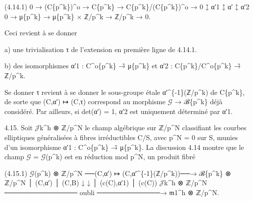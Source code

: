 \documentclass[11pt,a4paper]{article}
\begin{document}
(4.14.1)        0 → (C\textunderscore{}\{p\textasciicircum{}k\})\textasciicircum{}o → C\textunderscore{}\{p\textasciicircum{}k\} → C\textunderscore{}\{p\textasciicircum{}k\}/(C\textunderscore{}\{p\textasciicircum{}k\})\textasciicircum{}o → 0 ↓̃ α′\textunderscore{}1       ↓̃ α′            ↓̃ α′\textunderscore{}2 0 → μ\textunderscore{}\{p\textasciicircum{}k\} → μ\textunderscore{}\{p\textasciicircum{}k\} × ℤ/p\textasciicircum{}k → ℤ/p\textasciicircum{}k → 0.

Ceci revient à se donner

a) une trivialisation τ de l'extension en première ligne de 4.14.1.

b) des isomorphismes α′\textunderscore{}1 : C\textasciicircum{}o\textunderscore{}\{p\textasciicircum{}k\} →̃ μ\textunderscore{}\{p\textasciicircum{}k\} et α′\textunderscore{}2 : C\textunderscore{}\{p\textasciicircum{}k\}/C\textasciicircum{}o\textunderscore{}\{p\textasciicircum{}k\} →̃ ℤ/p\textasciicircum{}k.

Se donner τ revient à se donner le sous-groupe étale α′\textasciicircum{}\{-1\}(ℤ/p\textasciicircum{}k) de C\textunderscore{}\{p\textasciicircum{}k\}, de sorte que (C,α′) ↦ (C,τ) correspond au morphisme \ensuremath{\mathcal{G}} → ℬ\textunderscore{}\{p\textasciicircum{}k\} déjà considéré. Par ailleurs, si det(α′) = 1, α′\textunderscore{}2 est uniquement déterminé par α′\textunderscore{}1.

4.15. Soit \ensuremath{\mathcal{J}}\textunderscore{}k\textasciicircum{}h ⊗ ℤ/p\textasciicircum{}N le champ algébrique sur ℤ/p\textasciicircum{}N classifiant les courbes elliptiques généralisées à fibres irréductibles C/S, avec p\textasciicircum{}N = 0 sur S, munies d'un isomorphisme α′\textunderscore{}1 : C\textasciicircum{}o\textunderscore{}\{p\textasciicircum{}k\} →̃ μ\textunderscore{}\{p\textasciicircum{}k\}. La discussion 4.14 montre que le champ \ensuremath{\mathcal{G}} = \ensuremath{\mathcal{G}}(p\textasciicircum{}k) est en réduction mod p\textasciicircum{}N, un produit fibré

(4.15.1)        \ensuremath{\mathcal{G}}(p\textasciicircum{}k) ⊗ ℤ/p\textasciicircum{}N ──(C,α′) ↦ (C,α′\textasciicircum{}\{-1\}(ℤ/p\textasciicircum{}k))──→ ℬ\textunderscore{}\{p\textasciicircum{}k\} ⊗ ℤ/p\textasciicircum{}N │ (C,α′)                                      │ (C,B) ↓                                              ↓ │ (c(C),α′\textunderscore{}1)                                  │ (c(C)) \ensuremath{\mathcal{J}}\textunderscore{}k\textasciicircum{}h ⊗ ℤ/p\textasciicircum{}N ─────────────── oubli ─────────────→ \ensuremath{\mathfrak{m}}\textunderscore{}1\textasciicircum{}h ⊗ ℤ/p\textasciicircum{}N.
\end{document}
